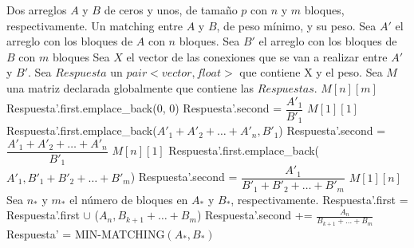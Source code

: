 \documentclass[12pt,a4,paper]{article}
\begin{document}
\begin{algorithmic}[1]
    \REQUIRE Dos arreglos $A$ y $B$ de ceros y unos, de tamaño $p$ con $n$ y $m$ bloques, respectivamente.
    \ENSURE Un matching entre $A$ y $B$, de peso mínimo, y su peso. \newline \newline
        \STATE Sea $A'$ el arreglo con los bloques de $A$ con $n$ bloques.
        \STATE Sea $B'$ el arreglo con los bloques de $B$ con $m$ bloques
        \STATE Sea $X$ el vector de las conexiones que se van a realizar entre $A'$ y $B'$.
        \STATE Sea $Respuesta$ un $pair<vector, float>$ que contiene X y el peso.
        \STATE Sea $M$ una matriz declarada globalmente que contiene las $Respuestas$.
            \RETURN $M[n][m]$
        \ENDIF
        \STATE
                \STATE Respuesta'.first.emplace\_back(0, 0)
                \STATE Respuesta'.second = $\dfrac{A'_1}{B'_1}$
            \ENDIF
            \RETURN $M[1][1]$
        \ENDIF
        \STATE
                \STATE Respuesta'.first.emplace\_back($A'_1+A'_2+\ldots +A'_n, B'_1$)
                \STATE Respuesta'.second = $\dfrac{A'_1+A'_2+\ldots +A'_n}{B'_1}$
            \ENDIF
            \RETURN $M[n][1]$
        \ENDIF
        \STATE
                \STATE Respuesta'.first.emplace\_back($A'_1, B'_1+B'_2+\ldots +B'_m$)
                \STATE Respuesta'.second = $\dfrac{A'_1}{B'_1+B'_2+\ldots +B'_m}$
            \ENDIF
            \RETURN $M[1][n]$
        \ENDIF
        \STATE
         
             
            \STATE Sea $n_*$ y $m_*$ el número de bloques en $A_*$ y $B_*$, respectivamente.
                \STATE Respuesta'.first = Respuesta'.first $\cup$ ($A_n, B_{k+1}+\ldots+B_m$)
                \STATE Respuesta'.second += $\frac{A_n}{B_{k+1}+\ldots+B_m}$
            \ELSE
                \STATE Respuesta' = {\textsc{MIN-MATCHING}$(A_*, B_*)$}

\end{algorithmic}
\end{document}
